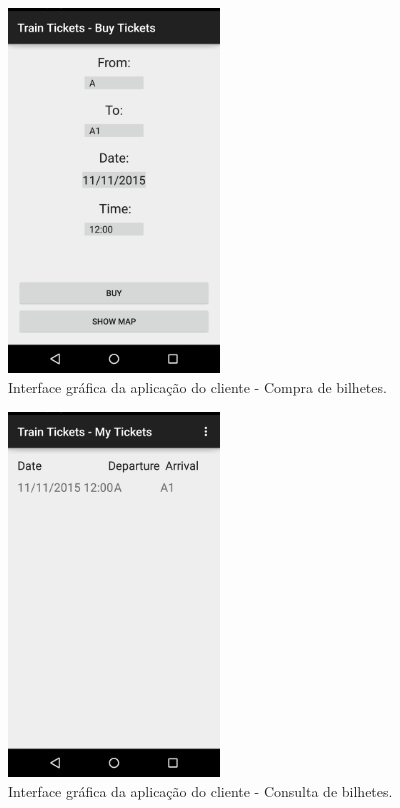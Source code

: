 \documentclass[12pt]{article}
\begin{document}
\begin{figure}[H]
    \centering
    \includegraphics[width=0.5\textwidth]{Screenshot_Buy_Ticket.png}
    \caption{Interface gráfica da aplicação do cliente - Compra de bilhetes.}
    \label{fig:c4}
\end{figure}
\begin{figure}[H]
    \centering
    \includegraphics[width=0.5\textwidth]{Screenshot_My_Tickets.png}
    \caption{Interface gráfica da aplicação do cliente - Consulta de bilhetes.}
    \label{fig:c5}
\end{figure}
\end{document}
